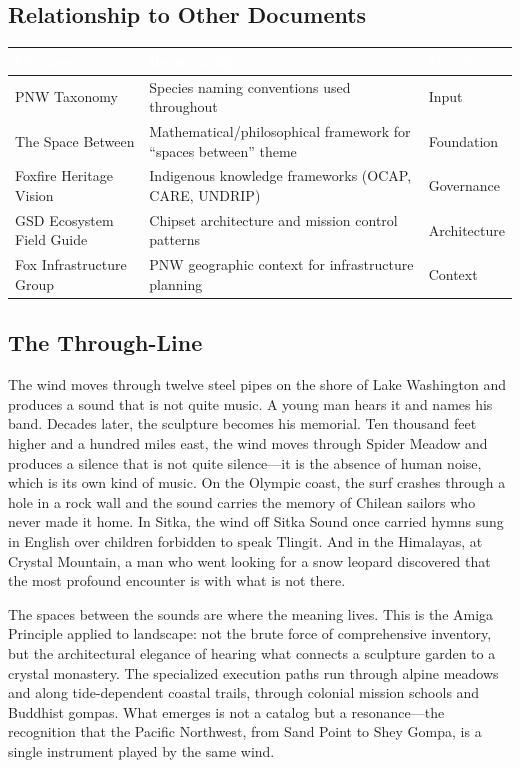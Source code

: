 \documentclass[11pt,letterpaper]{article}
\newcommand{\tableheader}[1]{\textbf{\sffamily\textcolor{white}{#1}}}
\begin{document}
\subsection{Relationship to Other Documents}

\begin{center}
\begin{tabularx}{\textwidth}{L{4cm}XC{2.5cm}}
\toprule
{}
\tableheader{Document} & \tableheader{Relationship} & \tableheader{Direction} \\
\midrule
PNW Taxonomy & Species naming conventions used throughout & Input \\
The Space Between & Mathematical/philosophical framework for ``spaces between'' theme & Foundation \\
Foxfire Heritage Vision & Indigenous knowledge frameworks (OCAP, CARE, UNDRIP) & Governance \\
GSD Ecosystem Field Guide & Chipset architecture and mission control patterns & Architecture \\
Fox Infrastructure Group & PNW geographic context for infrastructure planning & Context \\
\bottomrule
\end{tabularx}
\end{center}

\subsection{The Through-Line}

\begin{quotebox}
The wind moves through twelve steel pipes on the shore of Lake Washington and produces a sound that is not quite music. A young man hears it and names his band. Decades later, the sculpture becomes his memorial. Ten thousand feet higher and a hundred miles east, the wind moves through Spider Meadow and produces a silence that is not quite silence---it is the absence of human noise, which is its own kind of music. On the Olympic coast, the surf crashes through a hole in a rock wall and the sound carries the memory of Chilean sailors who never made it home. In Sitka, the wind off Sitka Sound once carried hymns sung in English over children forbidden to speak Tlingit. And in the Himalayas, at Crystal Mountain, a man who went looking for a snow leopard discovered that the most profound encounter is with what is not there.

The spaces between the sounds are where the meaning lives. This is the Amiga Principle applied to landscape: not the brute force of comprehensive inventory, but the architectural elegance of hearing what connects a sculpture garden to a crystal monastery. The specialized execution paths run through alpine meadows and along tide-dependent coastal trails, through colonial mission schools and Buddhist gompas. What emerges is not a catalog but a resonance---the recognition that the Pacific Northwest, from Sand Point to Shey Gompa, is a single instrument played by the same wind.
\end{quotebox}
\end{document}
